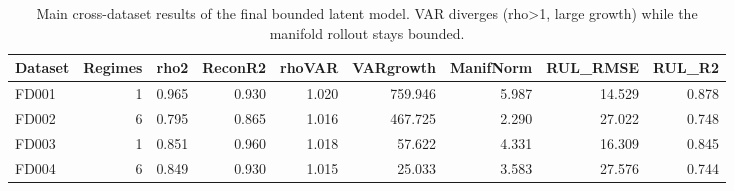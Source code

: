\begin{table}[t]
\centering
\caption{Main cross-dataset results of the final bounded latent model. VAR diverges (rho>1, large growth) while the manifold rollout stays bounded.}
\label{tab:main_cross_dataset}
\begin{tabular}{lrrrrrrrr}
\toprule
Dataset & Regimes & rho2 & ReconR2 & rhoVAR & VARgrowth & ManifNorm & RUL\_RMSE & RUL\_R2 \\
\midrule
FD001 & 1 & 0.965 & 0.930 & 1.020 & 759.946 & 5.987 & 14.529 & 0.878 \\
FD002 & 6 & 0.795 & 0.865 & 1.016 & 467.725 & 2.290 & 27.022 & 0.748 \\
FD003 & 1 & 0.851 & 0.960 & 1.018 & 57.622 & 4.331 & 16.309 & 0.845 \\
FD004 & 6 & 0.849 & 0.930 & 1.015 & 25.033 & 3.583 & 27.576 & 0.744 \\
\bottomrule
\end{tabular}
\end{table}